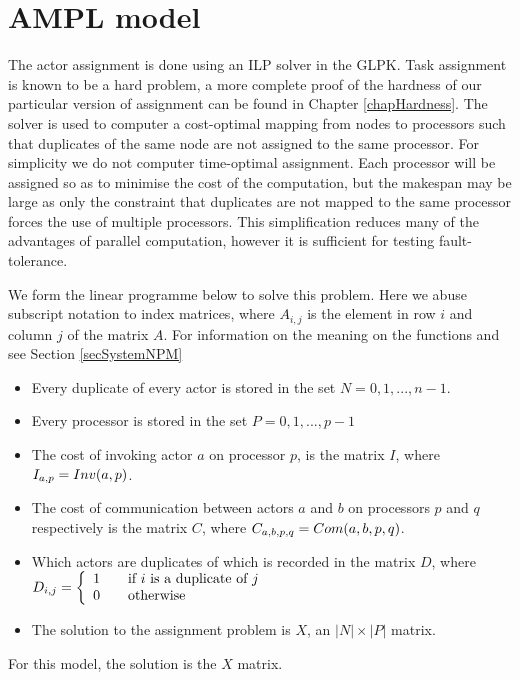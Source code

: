 \section{AMPL model}

The actor assignment is done using an ILP solver in the GLPK.
Task assignment is known to be a hard problem, a more complete proof of the hardness of our particular version of assignment can be found in Chapter \ref{chapHardness}.
The solver is used to computer a cost-optimal mapping from nodes to processors such that duplicates of the same node are not assigned to the same processor.
For simplicity we do not computer time-optimal assignment.
Each processor will be assigned so as to minimise the cost of the computation, but the makespan may be large as only the constraint that duplicates are not mapped to the same processor forces the use of multiple processors.
This simplification reduces many of the advantages of parallel computation, however it is sufficient for testing fault-tolerance.

We form the linear programme below to solve this problem.
Here we abuse subscript notation to index matrices, where $A_{i,j}$ is the element in row $i$ and column $j$ of the matrix $A$.
For information on the meaning on the functions  and  see Section \ref{secSystemNPM}
\begin{itemize}
	\item Every duplicate of every actor is stored in the set $N = {0, 1, ..., n-1}$.
	\item Every processor is stored in the set $P = {0, 1, ..., p-1}$
	\item The cost of invoking actor $a$ on processor $p$, is the matrix $I$, where $I_{a,p} = Inv(a, p)$.
	\item The cost of communication between actors $a$ and $b$ on processors $p$ and $q$ respectively is the matrix $C$, where $C_{a,b,p,q} = Com(a, b, p, q)$.
	\item Which actors are duplicates of which is recorded in the matrix $D$, where $D_{i,j} = \mbox{$\left\{ 
		\begin{array}{l l}
			1 \quad & \mbox{if $i$ is a duplicate of $j$}\\
			0 & \mbox{otherwise}\\ \end{array} \right.$} \\$
	\item The solution to the assignment problem is $X$, an $|N| \times |P|$ matrix.
\end{itemize}
For this model, the solution is the $X$ matrix.


